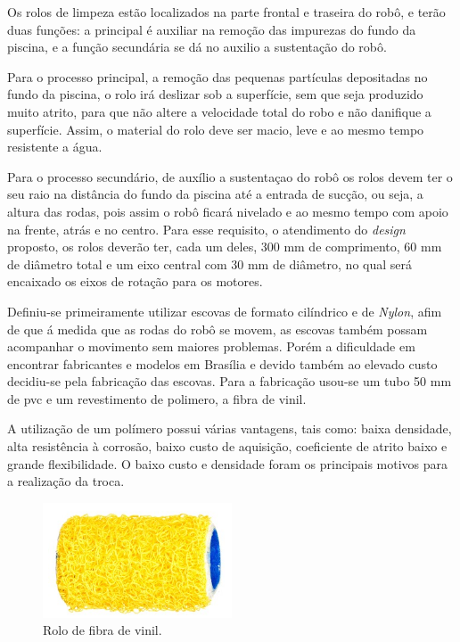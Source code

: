 Os rolos de limpeza estão localizados na parte frontal e traseira do robô, e  terão duas funções: a principal é auxiliar na remoção das impurezas do fundo da piscina, e a função secundária se dá no auxilio a sustentação do robô.

Para o processo principal, a remoção das pequenas partículas depositadas no fundo da piscina, o rolo irá deslizar sob a superfície, sem que seja produzido muito atrito, para que não altere a velocidade total do robo e não danifique a superfície. Assim, o material do rolo deve ser macio, leve e ao mesmo tempo resistente a água.

Para o processo secundário, de auxílio a sustentaçao do robô os rolos devem ter o seu raio na distância do fundo da piscina até a entrada de sucção, ou seja, a altura das rodas, pois assim o robô ficará nivelado e ao mesmo tempo com apoio na frente, atrás e no centro. Para esse requisito, o atendimento do \textit{design} proposto, os rolos deverão ter, cada um deles, 300 mm de comprimento, 60 mm de diâmetro total e um eixo central com 30 mm de diâmetro, no qual será encaixado os eixos de rotação para os motores.

Definiu-se primeiramente utilizar escovas de formato cilíndrico e de \textit{Nylon}, afim de que á medida que as rodas do robô se movem, as escovas também possam acompanhar o movimento sem maiores problemas. Porém a dificuldade em encontrar fabricantes e modelos em Brasília e devido também ao elevado custo decidiu-se pela fabricação das escovas. Para a fabricação usou-se um tubo 50 mm de pvc e um revestimento de polimero, a fibra de vinil.

A utilização de um polímero possui várias vantagens, tais como: baixa densidade, alta resistência à corrosão, baixo custo de aquisição, coeficiente de atrito baixo e grande flexibilidade. O baixo custo e densidade foram os principais motivos para a realização da troca.
\par
  \begin{figure}[h]
    \centering
    \includegraphics[width=0.5\textwidth]{figures/brush-vinil.png}
    \caption{Rolo de fibra de vinil.}
    \label{fig:brush-vinil}
  \end{figure}
  \FloatBarrier
\par
